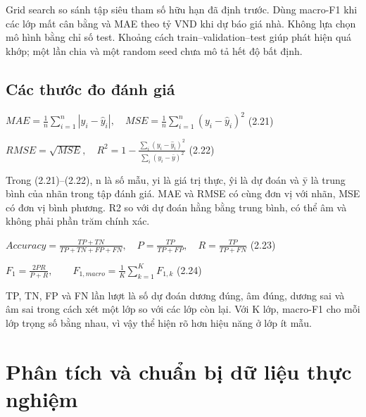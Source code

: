 Grid search so sánh tập siêu tham số hữu hạn đã định trước. Dùng
macro-F1 khi các lớp mất cân bằng và MAE theo tỷ VND khi dự báo giá nhà.
Không lựa chọn mô hình bằng chỉ số test. Khoảng cách
train--validation--test giúp phát hiện quá khớp; một lần chia và một
random seed chưa mô tả hết độ bất định.

\subsection{Các thước đo đánh giá}\label{cuxe1c-thux1b0ux1edbc-ux111o-ux111uxe1nh-giuxe1}

\(MAE = \frac{1}{n}\sum_{i = 1}^{n}|y_{i} - {\hat{y}}_{i}|,\quad MSE = \frac{1}{n}\sum_{i = 1}^{n}(y_{i} - {\hat{y}}_{i})^{2}\)
(2.21)

\(RMSE = \sqrt{MSE},\quad R^{2} = 1 - \frac{\sum_{i}^{}(y_{i} - {\hat{y}}_{i})^{2}}{\sum_{i}^{}(y_{i} - \bar{y})^{2}}\)
(2.22)

Trong (2.21)--(2.22), n là số mẫu, yi là giá trị thực, ŷi là dự đoán và
ȳ là trung bình của nhãn trong tập đánh giá. MAE và RMSE có cùng đơn vị
với nhãn, MSE có đơn vị bình phương. R2 so với dự đoán hằng bằng trung
bình, có thể âm và không phải phần trăm chính xác.

\(Accuracy = \frac{TP + TN}{TP + TN + FP + FN},\quad P = \frac{TP}{TP + FP},\quad R = \frac{TP}{TP + FN}\)
(2.23)

\(F_{1} = \frac{2PR}{P + R},\quad\quad F_{1,macro} = \frac{1}{K}\sum_{k = 1}^{K}F_{1,k}\)
(2.24)

TP, TN, FP và FN lần lượt là số dự đoán dương đúng, âm đúng, dương sai
và âm sai trong cách xét một lớp so với các lớp còn lại. Với K lớp,
macro-F1 cho mỗi lớp trọng số bằng nhau, vì vậy thể hiện rõ hơn hiệu
năng ở lớp ít mẫu.

\section{Phân tích và chuẩn bị dữ liệu thực nghiệm}\label{phuxe2n-tuxedch-vuxe0-chuux1ea9n-bux1ecb-dux1eef-liux1ec7u-thux1ef1c-nghiux1ec7m}

\label{tab:legacy-2.2}

